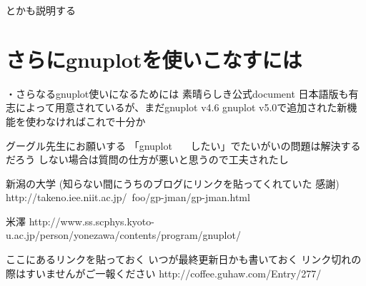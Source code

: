 \documentclass[11pt]{jsarticle}
\begin{document}
とかも説明する


\section{さらにgnuplotを使いこなすには}
・さらなるgnuplot使いになるためには
素晴らしき公式document
日本語版も有志によって用意されているが、まだgnuplot v4.6
gnuplot v5.0で追加された新機能を使わなければこれで十分か

グーグル先生にお願いする
「gnuplot ~~~したい」でたいがいの問題は解決するだろう
しない場合は質問の仕方が悪いと思うので工夫されたし

新潟の大学
(知らない間にうちのブログにリンクを貼ってくれていた 感謝)
http://takeno.iee.niit.ac.jp/~foo/gp-jman/gp-jman.html

米澤
http://www.ss.scphys.kyoto-u.ac.jp/person/yonezawa/contents/program/gnuplot/

ここにあるリンクを貼っておく
いつが最終更新日かも書いておく
リンク切れの際はすいませんがご一報ください
http://coffee.guhaw.com/Entry/277/
\end{document}
